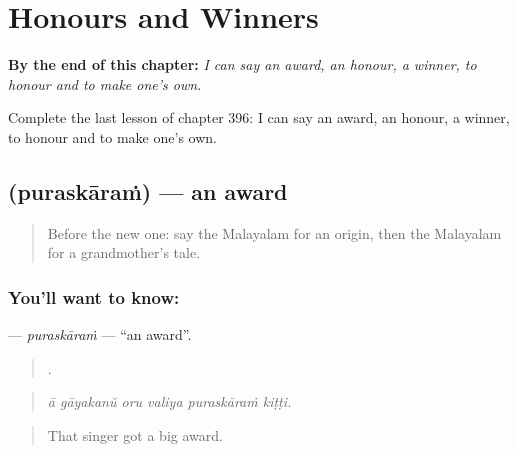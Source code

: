 
\chapter{Honours and Winners}
\label{ch:ml-honours-and-winners}

\begin{chapteropening}
\textbf{By the end of this chapter:} \emph{I can say an award, an honour, a winner, to honour and to make one's own.}

Complete the last lesson of chapter 396: I can say an award, an honour, a winner, to honour and to make one's own.
\end{chapteropening}

\section[\texorpdfstring{\ml{പുരസ്കാരം} (puraskāraṁ)}{പുരസ്കാരം (puraskāraṁ)}]{ (puraskāraṁ) — an award}

\label{lesson:ML-C396-puraskaram}



\begin{quote}
Before the new one: say the Malayalam for an origin, then the Malayalam for a grandmother's tale.
\end{quote}

\subsection*{You'll want to know: }
\textbf{} — \emph{puraskāraṁ} — \textquotedblleft{}an award\textquotedblright{}.

\begin{quote}
     .
\end{quote}

\begin{quote}
\emph{ā gāyakanŭ oru valiya puraskāraṁ kiṭṭi.}
\end{quote}

\begin{quote}
That singer got a big award.
\end{quote}


